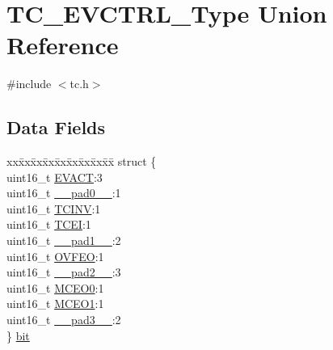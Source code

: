 \hypertarget{union_t_c___e_v_c_t_r_l___type}{}\section{T\+C\+\_\+\+E\+V\+C\+T\+R\+L\+\_\+\+Type Union Reference}
\label{union_t_c___e_v_c_t_r_l___type}


{\ttfamily \#include $<$tc.\+h$>$}

\subsection*{Data Fields}
\begin{DoxyCompactItemize}
\item 
\begin{tabbing}
xx\=xx\=xx\=xx\=xx\=xx\=xx\=xx\=xx\=\kill
struct \{\\
\>uint16\_t \mbox{\hyperlink{union_t_c___e_v_c_t_r_l___type_a5522ffbc96ee09f075b96c00c25b3684}{EVACT}}:3\\
\>uint16\_t \mbox{\hyperlink{union_t_c___e_v_c_t_r_l___type_a77132c2c26a75f5b8751b235cda23828}{\_\_pad0\_\_}}:1\\
\>uint16\_t \mbox{\hyperlink{union_t_c___e_v_c_t_r_l___type_a43edaf20b36303cc4856be3c7f3aec4e}{TCINV}}:1\\
\>uint16\_t \mbox{\hyperlink{union_t_c___e_v_c_t_r_l___type_a7001429c571317c6c85f60ece4a63783}{TCEI}}:1\\
\>uint16\_t \mbox{\hyperlink{union_t_c___e_v_c_t_r_l___type_ab72e3a1f2f7db8695c60c658f5a0f11a}{\_\_pad1\_\_}}:2\\
\>uint16\_t \mbox{\hyperlink{union_t_c___e_v_c_t_r_l___type_ad5675910f0a67704471b8e7f6ea2014e}{OVFEO}}:1\\
\>uint16\_t \mbox{\hyperlink{union_t_c___e_v_c_t_r_l___type_a82701c5ec65a0fca9a84d8edc46a8192}{\_\_pad2\_\_}}:3\\
\>uint16\_t \mbox{\hyperlink{union_t_c___e_v_c_t_r_l___type_aba4082128d6a03384ecc38161fee7ea3}{MCEO0}}:1\\
\>uint16\_t \mbox{\hyperlink{union_t_c___e_v_c_t_r_l___type_a1cdf241856b11b8edf3f264507b3384e}{MCEO1}}:1\\
\>uint16\_t \mbox{\hyperlink{union_t_c___e_v_c_t_r_l___type_a1b0a1a9de051f3174325808d959500f7}{\_\_pad3\_\_}}:2\\
\} \mbox{\hyperlink{union_t_c___e_v_c_t_r_l___type_a2ce1b1968361ddb9937bdae163d2f3ff}{bit}}\\


\end{tabbing}
\end{DoxyCompactItemize}
